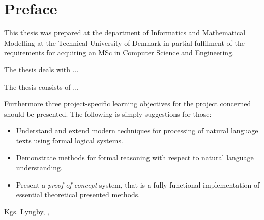 
\chapter{Preface}

This thesis was prepared at the department of Informatics and Mathematical Modelling at the Technical University of Denmark in partial fulfilment of the
requirements for acquiring an MSc in Computer Science and Engineering. 

The thesis deals with ... 

The thesis consists of ...

Furthermore three project-specific learning objectives for the project concerned should be presented. The following is simply suggestions for those:
\begin{itemize}
	\item Understand and extend modern techniques for processing of natural language texts using formal logical systems.

	\item Demonstrate methods for formal reasoning with respect to natural language understanding.
	
	\item Present a \emph{proof of concept} system, that is a fully functional implementation of essential theoretical presented methods.
\end{itemize}

\vspace{20mm}
\begin{center}
	\hspace{20mm} Kgs. Lyngby, \thesishandin, \thesisyear 
	\vspace{5mm}
	\newline
 

\end{center}
\begin{flushright}
	\vspace{6em}
	\thesisauthor
\end{flushright}

